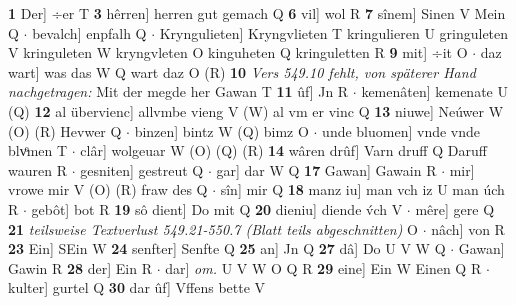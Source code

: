 \documentclass[8pt,a4paper,notitlepage]{article}
\begin{document}
\begin{table}[ht]
\begin{minipage}[t]{0.5\linewidth}
\textbf{1} Der] ÷er T \textbf{3} hêrren] herren gut gemach Q \textbf{6} vil] wol R \textbf{7} sînem] Sinen V Mein Q  $\cdot$ bevalch] enpfalh Q  $\cdot$ Kryngulieten] Kryngvlieten T kringulieren U gringuleten V kringuleten W kryngvleten O kinguheten Q kringuletten R \textbf{9} mit] ÷it O  $\cdot$ daz wart] was das W Q wart daz O (R) \textbf{10} \textit{Vers 549.10 fehlt, von späterer Hand nachgetragen:} Mit der megde her Gawan T  \textbf{11} ûf] Jn R  $\cdot$ kemenâten] kemenate U (Q) \textbf{12} al übervienc] allvmbe vieng V (W) al vm er vinc Q \textbf{13} niuwe] Neúwer W (O) (R) Hevwer Q  $\cdot$ binzen] bintz W (Q) bimz O  $\cdot$ unde bluomen] vnde vnde blvͦmen T  $\cdot$ clâr] wolgeuar W (O) (Q) (R) \textbf{14} wâren drûf] Varn druff Q Daruff wauren R  $\cdot$ gesniten] gestreut Q  $\cdot$ gar] dar W Q \textbf{17} Gawan] Gawain R  $\cdot$ mir] vrowe mir V (O) (R) fraw des Q  $\cdot$ sîn] mir Q \textbf{18} manz iu] man vch iz U man úch R  $\cdot$ gebôt] bot R \textbf{19} sô dient] Do mit Q \textbf{20} dieniu] diende v́ch V  $\cdot$ mêre] gere Q \textbf{21} \textit{teilsweise Textverlust 549.21-550.7 (Blatt teils abgeschnitten)} O   $\cdot$ nâch] von R \textbf{23} Ein] SEin W \textbf{24} senfter] Senfte Q \textbf{25} an] Jn Q \textbf{27} dâ] Do U V W Q  $\cdot$ Gawan] Gawin R \textbf{28} der] Ein R  $\cdot$ dar] \textit{om.} U V W O Q R \textbf{29} eine] Ein W Einen Q R  $\cdot$ kulter] gurtel Q \textbf{30} dar ûf] Vffens bette V \newline
\end{minipage}
\end{table}
\end{document}
